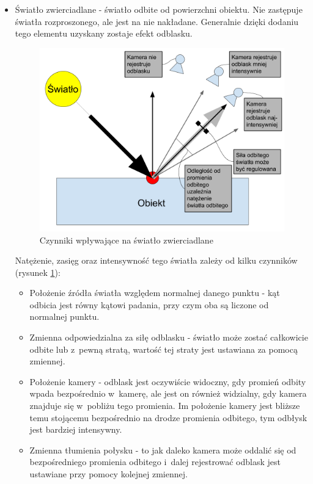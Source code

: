 \documentclass[a4paper,twoside,12pt]{book}
\begin{document}
\begin{itemize}
    
    
    \item Światło zwierciadlane - światło odbite od powierzchni obiektu. Nie zastępuje światła rozproszonego, ale jest na nie nakładane. Generalnie dzięki dodaniu tego elementu uzyskany zostaje efekt odblasku.
    \begin{figure}[H]
        \centering
        \includegraphics[width=\textwidth]{res/specular_vectors.png}
        \caption{Czynniki wpływające na światło zwierciadlane}
        \label{fig:specular_vectors}
    \end{figure}
    
    Natężenie, zasięg oraz intensywność tego światła zależy od kilku czynników (rysunek \ref{fig:specular_vectors}):
    \begin{itemize}
        \item Położenie źródła światła względem normalnej danego punktu - kąt odbicia jest równy kątowi padania, przy czym oba są liczone od normalnej punktu. 
        \item Zmienna odpowiedzialna za siłę odblasku - światło może zostać całkowicie odbite lub z~pewną stratą, wartość tej straty jest ustawiana za pomocą zmiennej.
        \item Położenie kamery - odblask jest oczywiście widoczny, gdy promień odbity wpada bezpośrednio w~kamerę, ale jest on również widzialny, gdy kamera znajduje się w~pobliżu tego promienia. Im położenie kamery jest bliższe temu stojącemu bezpośrednio na drodze promienia odbitego, tym odbłysk jest bardziej intensywny.
        \item Zmienna tłumienia połysku - to jak daleko kamera może oddalić się od bezpośredniego promienia odbitego i~dalej rejestrować odblask jest ustawiane przy pomocy kolejnej zmiennej.
    \end{itemize}
    

\end{itemize}
\end{document}
